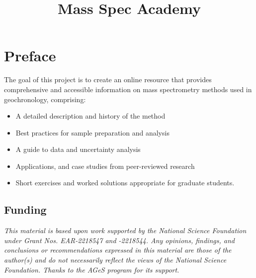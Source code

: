 \documentclass[
  letterpaper,
  DIV=11,
  numbers=noendperiod]{scrreprt}
\title{Mass Spec Academy}
\author{}
\date{}
\providecommand{\tightlist}{%
  \setlength{\itemsep}{0pt}\setlength{\parskip}{0pt}}\usepackage{longtable,booktabs,array}
\renewcommand*\contentsname{Table of contents}
\newcommand\contentsname{Table of contents}
\begin{document}
\maketitle

\renewcommand*\contentsname{Table of contents}
{
\hypersetup{linkcolor=}
\setcounter{tocdepth}{2}
\tableofcontents
}


\chapter*{Preface}\label{preface}


The goal of this project is to create an online resource that provides
comprehensive and accessible information on mass spectrometry methods
used in geochronology, comprising:

\begin{itemize}
\tightlist
\item
  A detailed description and history of the method
\item
  Best practices for sample preparation and analysis
\item
  A guide to data and uncertainty analysis
\item
  Applications, and case studies from peer-reviewed research
\item
  Short exercises and worked solutions appropriate for graduate
  students.
\end{itemize}

\section*{Funding}\label{funding}


\emph{This material is based upon work supported by the National Science
Foundation under Grant Nos. EAR-2218547 and -2218544. Any opinions,
findings, and conclusions or recommendations expressed in this material
are those of the author(s) and do not necessarily reflect the views of
the National Science Foundation. Thanks to the AGeS program for its
support.}
\end{document}
